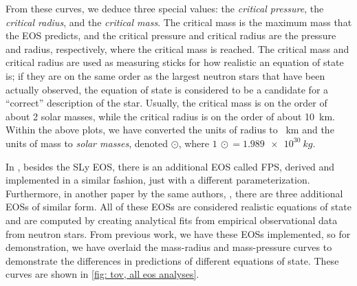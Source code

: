 From these curves, we deduce three special values: the \textit{critical pressure}, the \textit{critical radius}, and the \textit{critical mass}. The critical mass is the maximum mass that the EOS predicts, and the critical pressure and critical radius are the pressure and radius, respectively, where the critical mass is reached. The critical mass and critical radius are used as measuring sticks for how realistic an equation of state is; if they are on the same order as the largest neutron stars that have been actually observed, the equation of state is considered to be a candidate for a ``correct'' description of the star. Usually, the critical mass is on the order of about 2 solar masses, while the critical radius is on the order of about \SI{10}{km}. Within the above plots, we have converted the units of radius to \SI{}{km} and the units of mass to \textit{solar masses}, denoted $\odot$, where $\SI{1}{\odot} = \SI{1.989e+30}{kg}.$

In \autocite{SLy_2004}, besides the SLy EOS, there is an additional EOS called FPS, derived and implemented in a similar fashion, just with a different parameterization. Furthermore, in another paper by the same authors, \autocite{BSk_2013}, there are three additional EOSs of similar form. All of these EOSs are considered realistic equations of state and are computed by creating analytical fits from empirical observational data from neutron stars. From previous work, we have these EOSs implemented, so for demonstration, we have overlaid the mass-radius and mass-pressure curves to demonstrate the differences in predictions of different equations of state. These curves are shown in \autoref{fig: tov, all eos analyses}.

